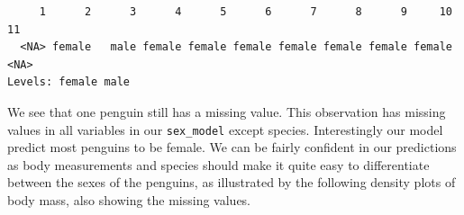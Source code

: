 \documentclass[
  letterpaper,
  DIV=11,
  numbers=noendperiod]{scrreprt}
\newenvironment{Shaded}{\begin{snugshade}}{\end{snugshade}}
\newcommand{\AttributeTok}[1]{\textcolor[rgb]{0.40,0.45,0.13}{#1}}
\newcommand{\CommentTok}[1]{\textcolor[rgb]{0.37,0.37,0.37}{#1}}
\newcommand{\FloatTok}[1]{\textcolor[rgb]{0.68,0.00,0.00}{#1}}
\newcommand{\FunctionTok}[1]{\textcolor[rgb]{0.28,0.35,0.67}{#1}}
\newcommand{\NormalTok}[1]{\textcolor[rgb]{0.00,0.23,0.31}{#1}}
\newcommand{\OtherTok}[1]{\textcolor[rgb]{0.00,0.23,0.31}{#1}}
\newcommand{\SpecialCharTok}[1]{\textcolor[rgb]{0.37,0.37,0.37}{#1}}
\newcommand{\StringTok}[1]{\textcolor[rgb]{0.13,0.47,0.30}{#1}}
\begin{document}
\begin{Shaded}
\end{Shaded}

\begin{verbatim}
     1      2      3      4      5      6      7      8      9     10     11 
  <NA> female   male female female female female female female female   <NA> 
Levels: female male
\end{verbatim}

We see that one penguin still has a missing value. This observation has
missing values in all variables in our \texttt{sex\_model} except
species. Interestingly our model predict most penguins to be female. We
can be fairly confident in our predictions as body measurements and
species should make it quite easy to differentiate between the sexes of
the penguins, as illustrated by the following density plots of body
mass, also showing the missing values.
\end{document}
